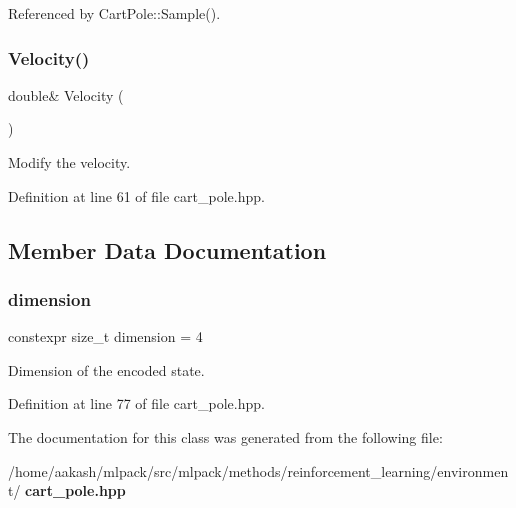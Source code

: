 Referenced by Cart\+Pole\+::\+Sample().

\mbox{\label{classmlpack_1_1rl_1_1CartPole_1_1State_a2bdce16cfc8c84b65f13ee9fffab1266}} 
\subsubsection{Velocity()\hspace{0.1cm}{\footnotesize\ttfamily [2/2]}}
{\footnotesize\ttfamily double\& Velocity (\begin{DoxyParamCaption}{ }\end{DoxyParamCaption})\hspace{0.3cm}{\ttfamily [inline]}}



Modify the velocity. 



Definition at line 61 of file cart\+\_\+pole.\+hpp.



\subsection{Member Data Documentation}
\mbox{\label{classmlpack_1_1rl_1_1CartPole_1_1State_ae813298f34ef9d793885fc04b54dff99}} 
\subsubsection{dimension}
{\footnotesize\ttfamily constexpr size\+\_\+t dimension = 4\hspace{0.3cm}{\ttfamily [static]}}



Dimension of the encoded state. 



Definition at line 77 of file cart\+\_\+pole.\+hpp.



The documentation for this class was generated from the following file\+:\begin{DoxyCompactItemize}
\item 
/home/aakash/mlpack/src/mlpack/methods/reinforcement\+\_\+learning/environment/\textbf{ cart\+\_\+pole.\+hpp}\end{DoxyCompactItemize}
